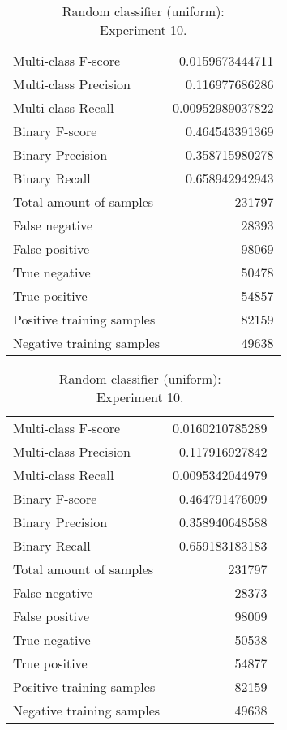 \begin{table}[H]
\begin{minipage}{0.5\textwidth}
\caption{Random classifier (uniform): \\Experiment 9.}
\centering
\begin{tabular}{l r}
\toprule
Multi-class F-score & 0.0159673444711 \\
Multi-class Precision & 0.116977686286 \\
Multi-class Recall & 0.00952989037822 \\
\midrule
Binary F-score & 0.464543391369 \\
Binary Precision & 0.358715980278 \\
Binary Recall & 0.658942942943 \\
\midrule
Total amount of samples & 231797 \\
False negative & 28393 \\
False positive & 98069 \\
True negative & 50478 \\
True positive & 54857 \\
\midrule
Positive training samples & 82159 \\
Negative training samples & 49638 \\
\bottomrule
\end{tabular}
\end{minipage}
\hfillx
\begin{minipage}{0.5\textwidth}
\caption{Random classifier (uniform): \\Experiment 10.}
\centering
\begin{tabular}{l r}
\toprule
Multi-class F-score & 0.0160210785289 \\
Multi-class Precision & 0.117916927842 \\
Multi-class Recall & 0.0095342044979 \\
\midrule
Binary F-score & 0.464791476099 \\
Binary Precision & 0.358940648588 \\
Binary Recall & 0.659183183183 \\
\midrule
Total amount of samples & 231797 \\
False negative & 28373 \\
False positive & 98009 \\
True negative & 50538 \\
True positive & 54877 \\
\midrule
Positive training samples & 82159 \\
Negative training samples & 49638 \\
\bottomrule
\end{tabular}
\end{minipage}
\end{table}
